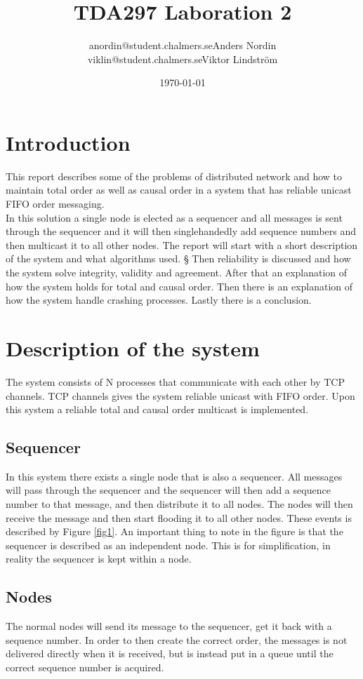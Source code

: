 \documentclass{article}
\title{TDA297 Laboration 2}
\author{anordin@student.chalmers.se\quad Anders Nordin\\
        viklin@student.chalmers.se\quad Viktor Lindstr\"{o}m}
\date{\today}
\begin{document}
\maketitle
\newpage

\section{Introduction}
  This report describes some of the problems of distributed network and how to maintain total order 
  as well as causal order in a system that has reliable unicast FIFO order messaging.\\
  In this solution a single node is elected as a sequencer and all messages is sent through
  the sequencer and it will then singlehandedly add sequence numbers and then multicast it
  to all other nodes.
  The report will start with a short description of the system and what algorithms used. §
  Then reliability is discussed and how the system solve integrity, validity and agreement.
  After that an explanation of how the system holds for total and causal order. Then there 
  is an explanation of how the system handle crashing processes. Lastly there is a conclusion.

\section{Description of the system}
 The system consists of N processes that communicate with each other by TCP channels.
 TCP channels gives the system reliable unicast with FIFO order. Upon this system a
 reliable total and causal order multicast is implemented. 
 \subsection{Sequencer}
 \label{sequencer}
 In this system there exists a single node that is also a sequencer. All messages will 
 pass through the sequencer and the sequencer will then add a sequence number to that 
 message, and then distribute it to all nodes. The nodes will then receive the message 
 and then start flooding it to all other nodes. These events is described by Figure 
 \ref{fig1}. An important thing to note in the figure is that the sequencer is described 
 as an independent node. This is for simplification, in reality the sequencer is kept 
 within a node. \\
 \subsection{Nodes}
 The normal nodes will send its message to the sequencer, get it back with a sequence number.
 In order to then create the correct order, the messages is not delivered directly when
 it is received, but is instead put in a queue until the correct sequence number is acquired.\\
\end{document}
